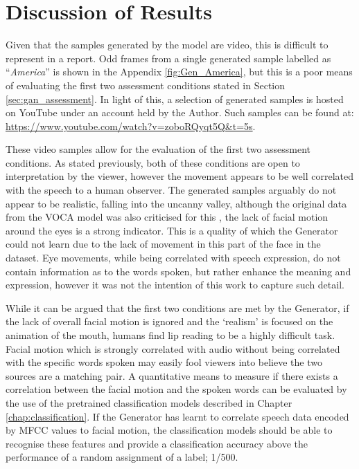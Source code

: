 \section{Discussion of Results}
Given that the samples generated by the model are video, this is difficult to represent in a report.
Odd frames from a single generated sample labelled as ``\textit{America}'' is shown in the Appendix \ref{fig:Gen_America}, but this is a poor means of evaluating the first two assessment conditions stated in Section \ref{sec:gan_assessment}.
In light of this, a selection of generated samples is hosted on YouTube under an account held by the Author. 
Such samples can be found at: \url{https://www.youtube.com/watch?v=zoboRQyqt5Q&t=5s}.

These video samples allow for the evaluation of the first two assessment conditions.
As stated previously, both of these conditions are open to interpretation by the viewer, however the movement appears to be well correlated with the speech to a human observer.
The generated samples arguably do not appear to be realistic, falling into the uncanny valley, although the original data from the VOCA model was also criticised for this \cite{Cudeiro2019}, the lack of facial motion around the eyes is a strong indicator.
This is a quality of which the Generator could not learn due to the lack of movement in this part of the face in the dataset.
Eye movements, while being correlated with speech expression, do not contain information as to the words spoken, but rather enhance the meaning and expression, however it was not the intention of this work to capture such detail.

While it can be argued that the first two conditions are met by the Generator, if the lack of overall facial motion is ignored and the `realism' is focused on the animation of the mouth, humans find lip reading to be a highly difficult task.
Facial motion which is strongly correlated with audio without being correlated with the specific words spoken may easily fool viewers into believe the two sources are a matching pair.
A quantitative means to measure if there exists a correlation between the facial motion and the spoken words can be evaluated by the use of the pretrained classification models described in Chapter \ref{chap:classification}.
If the Generator has learnt to correlate speech data encoded by MFCC values to facial motion, the classification models should be able to recognise these features and provide a classification accuracy above the performance of a random assignment of a label; 1/500.

